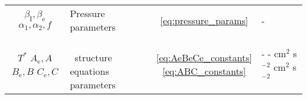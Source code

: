 \documentclass[../main.tex]{subfiles}
\begin{document}
\begin{table}[htb!]
\begin{tabular}{clcl}
        \vspace*{3mm}
        \makecell[c]{$\beta_\text{I},\beta_\text{e}$\\$\alpha_1,\alpha_2,f$} & Pressure parameters & \eqref{eq:pressure_params} & -\\
        \vspace*{3mm}
        \makecell[c]{$T^*$\\$A_\text{e},A$\\$B_\text{e},B$\\$C_\text{e},C$\\} & \makecell[l]{\citet{Paczynski1986b}\\~structure equations parameters} & \makecell[c]{\eqref{eq:AeBeCe_constants}\\\eqref{eq:ABC_constants}} & \makecell[l]{-\\-\\cm$^2$ s$^{-2}$\\cm$^2$ s$^{-2}$}\\
    \end{tabular}
\end{table}


\biblio

\end{document}
